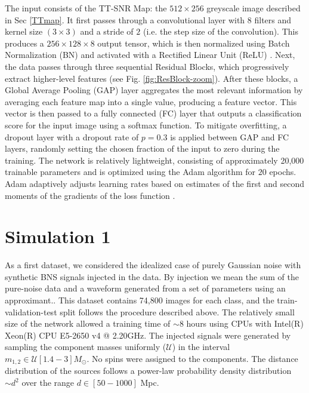 \documentclass[aps,prd,twocolumn,superscriptaddress,nofootinbib, longbibliography]{revtex4-2}
\begin{document}
	The input consists of the TT-SNR Map: the $512\times256$ greyscale image described in Sec \ref{TTmap}. It first passes through a convolutional layer with 8 filters and kernel size $(3\times3)$ and a stride of $2$ (i.e. the step size of the convolution). This produces a $256\times128\times8$ output tensor, which is then normalized using Batch Normalization (BN) \cite{bn} and activated with a Rectified Linear Unit (ReLU) \cite{krizhevsky2012imagenet}.
	Next, the data passes through three sequential Residual Blocks, which progressively extract higher-level features (see Fig. \ref{fig:ResBlock-zoom}). After these blocks, a Global Average Pooling (GAP) \cite{lin2014network} layer aggregates the most relevant information by averaging each feature map into a single value, producing a feature vector. This vector is then passed to a fully connected (FC) layer that outputs a classification score for the input image using a softmax function.
	To mitigate overfitting, a dropout layer with a dropout rate of $p=0.3$ is applied between GAP and FC layers, randomly setting the chosen fraction of the input to zero during the training. 
	The network is relatively lightweight, consisting of approximately 20,000 trainable parameters and is optimized using the Adam algorithm for $20$ epochs. Adam adaptively adjusts learning rates based on estimates of the first and second moments of the gradients of the loss function \cite{Adam}.

\section{Simulation 1} \label{simulation-1}

	As a first dataset, we considered the idealized case of purely Gaussian noise with synthetic BNS signals injected in the data. By injection we mean the sum of the pure-noise data and a waveform generated from a set of parameters using an approximant.. This dataset contains 74,800 images for each class, and the train-validation-test split follows the procedure described above. The relatively small size of the network allowed a training time of $\sim 8$ hours using CPUs with Intel(R) Xeon(R) CPU E5-2650 v4 @ 2.20GHz.
	The injected signals were generated by sampling the component masses uniformly ($\mathcal{U}$) in the interval $m_{1,2} \in \mathcal{U}[1.4 - 3] M_\odot$. No spins were assigned to the components. The distance distribution of the sources follows a power-law probability density distribution $\sim d^2$ over the range $d \in [50 - 1000]$ Mpc. 
\end{document}
